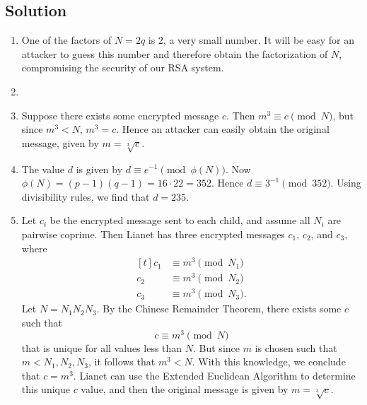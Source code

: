 \documentclass{article}
\begin{document}
\subsection*{Solution}
    \begin{enumerate}
        \item One of the factors of $N = 2q$ is $2$, a very small number. It will be easy for an attacker to guess this number and therefore obtain the factorization of $N$, compromising the security of our RSA system.
        \item 
        \item Suppose there exists some encrypted message $c$. Then $m^{3} \equiv c \pmod{N}$, but since $m^{3} < N$, $m^{3} = c$. Hence an attacker can easily obtain the original message, given by $m = \sqrt[3]{c}$.
        \item The value $d$ is given by $d \equiv e^{-1} \pmod{\phi(N)}$. Now $\phi(N) = (p - 1)(q - 1) = 16 \cdot 22 = 352$. Hence $d \equiv 3^{-1} \pmod{352}$. Using divisibility rules, we find that $d = 235$.
        \item Let $c_{i}$ be the encrypted message sent to each child, and assume all $N_{i}$ are pairwise coprime. Then Lianet has three encrypted messages $c_{1}$, $c_{2}$, and $c_{3}$, where
        $$\begin{aligned}[t]
            c_{1} &\equiv m^{3} \pmod{N_{1}} \\
            c_{2} &\equiv m^{3} \pmod{N_{2}} \\
            c_{3} &\equiv m^{3} \pmod{N_{3}}.
        \end{aligned}$$
        Let $N = N_{1}N_{2}N_{3}$. By the Chinese Remainder Theorem, there exists some $c$ such that $$c \equiv m^{3} \pmod{N}$$ that is unique for all values less than $N$. But since $m$ is chosen such that $m < N_{1}, N_{2}, N_{3}$, it follows that $m^{3} < N$. With this knowledge, we conclude that $c = m^{3}$. Lianet can use the Extended Euclidean Algorithm to determine this unique $c$ value, and then the original message is given  by $m = \sqrt[3]{c}$.
    \end{enumerate}
\end{document}
